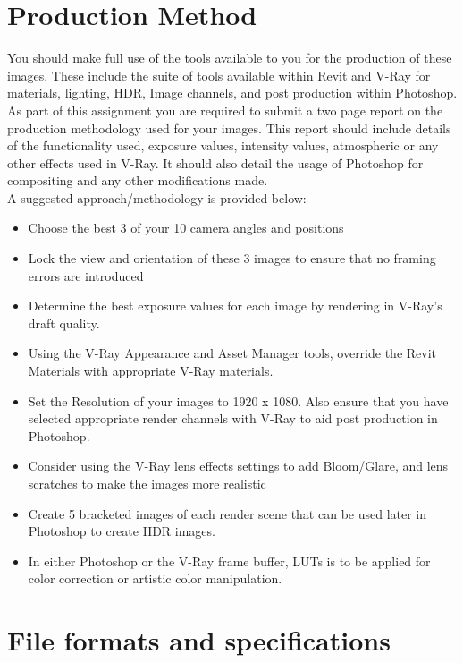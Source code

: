\section*{Production Method}

You should make full use of the tools available to you for the production of these images.  These include the suite of tools available within Revit and V-Ray for materials, lighting, HDR, Image channels, and post production within Photoshop.\\

As part of this assignment you are required to submit a two page report on the production methodology used for your images.  This report should include details of the functionality used, exposure values, intensity values, atmospheric or any other effects used in V-Ray.  It should also detail the usage of Photoshop for compositing and any other modifications made. \\

A suggested approach/methodology is provided below:

\begin{itemize}
	\item Choose the best 3 of your 10 camera angles and positions
	\item Lock the view and orientation of these 3 images to ensure that no framing errors are introduced
	\item Determine the best exposure values for each image by rendering in V-Ray's draft quality.	
	\item Using the V-Ray Appearance and Asset Manager tools, override the Revit Materials with appropriate V-Ray materials.
	\item Set the Resolution of your images to 1920 x 1080.  Also ensure that you have selected appropriate render channels with V-Ray to aid post production in Photoshop.
	\item Consider using the V-Ray lens effects settings to add Bloom/Glare, and lens scratches to make the images more realistic
	\item Create 5 bracketed images of each render scene that can be used later in Photoshop to create HDR images.
	\item In either Photoshop or the V-Ray frame buffer, LUTs is to be applied for color correction or artistic color manipulation. 
\end{itemize}


\section*{File formats and specifications}

